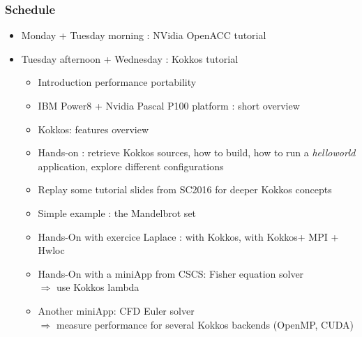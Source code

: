 \begin{frame}
  \frametitle{Schedule}

  \begin{itemize}
  \item Monday + Tuesday morning : NVidia OpenACC tutorial
  \item Tuesday afternoon + Wednesday : Kokkos tutorial
    \begin{itemize}
    \item Introduction performance portability
    \item IBM Power8 + Nvidia Pascal P100 platform : short overview
    \item Kokkos: features overview
    \item Hands-on : retrieve Kokkos sources, how to build, how to run a \textit{helloworld} application, explore different configurations
    \item Replay some tutorial slides from SC2016 for deeper Kokkos concepts
    \item Simple example : the Mandelbrot set
    \item Hands-On with exercice Laplace : with Kokkos, with Kokkos+ MPI + Hwloc
    \item Hands-On with a miniApp from CSCS: Fisher equation solver\\
      $\Rightarrow$ use Kokkos lambda
    \item Another miniApp: CFD Euler solver\\
      $\Rightarrow$ measure performance for several Kokkos backends (OpenMP, CUDA)
    \end{itemize}
  \end{itemize}

\end{frame}